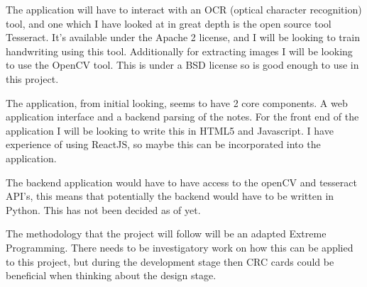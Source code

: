 \documentclass[11pt,fleqn,twoside]{article}
\begin{document}
The application will have to interact with an OCR (optical character recognition) tool, and one which I have looked at in great depth is the open source tool Tesseract. It's available under the Apache 2 license, and I will be looking to train handwriting using this tool. Additionally for extracting images I will be looking to use the OpenCV tool. This is under a BSD license so is good enough to use in this project.

The application, from initial looking, seems to have 2 core components. A web application interface and a backend parsing of the notes. For the front end of the application I will be looking to write this in HTML5 and Javascript. I have experience of using ReactJS, so maybe this can be incorporated into the application.

The backend application would have to have access to the openCV and tesseract API's, this means that potentially the backend would have to be written in Python. This has not been decided as of yet.

The methodology that the project will follow will be an adapted Extreme Programming. There needs to be investigatory work on how this can be applied to this project, but during the development stage then CRC cards could be beneficial when thinking about the design stage.

\end{document}
